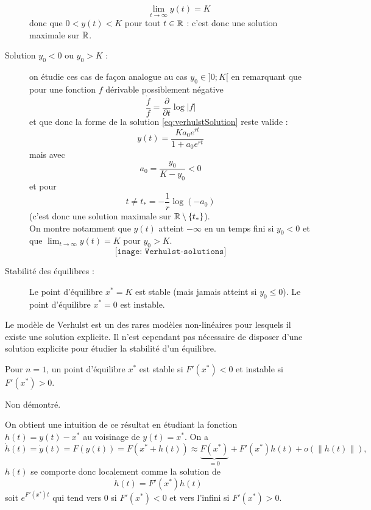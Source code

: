 \begin{description}
$$  \qquad
  \lim_{t \rightarrow \infty} y(t) = K
  $$
  donc que $0 < y(t) < K$ pour tout $t \in \mathbb{R}$ : c'est donc une solution maximale sur $\mathbb{R}$. \\
  \item[Solution $y_0 < 0$ ou $y_0 > K$ :] on étudie ces cas de façon analogue au cas $y_0 \in ]0; K[$ en remarquant que pour une fonction $f$ dérivable possiblement négative 
  $$
  \frac{\dot f}{f} = \frac{\partial}{\partial t} \log |f|
  $$
  et que donc la forme de la solution \eqref{eq:verhulstSolution} reste valide : 
  $$
  y(t) = \frac{K a_ 0 e^{rt}}{1 +  a_0 e^{rt}}
  $$
  mais avec
  $$
  a_0 = \frac{y_0}{K-y_0} < 0
  $$ 
  et pour 
  $$
  t \neq t_* = -\frac1r \log(-a_0)
  $$
  (c'est donc une solution maximale sur $\mathbb{R} \setminus \left\{t_*\right\}$). \\
  On montre notamment que $y(t)$ atteint $- \infty$ en un temps fini si $y_0 < 0$ et que $\lim_{t \rightarrow \infty} y(t) = K$ pour $y_0 > K$.
  $$
  \texttt{[image: Verhulst-solutions]}
  $$
  \item[Stabilité des équilibres :]
  Le point d'équilibre $x^* = K$ est stable (mais jamais atteint si $y_0 \leq 0$). Le point d'équilibre $x^* = 0$ est instable.
\end{description}

\remark
Le modèle de Verhulst est un des rares modèles non-linéaires pour lesquels il existe une solution explicite. Il n'est cependant pas nécessaire de disposer d'une solution explicite pour étudier la stabilité d'un équilibre.

\begin{theorem}[Stabilité ($n = 1$)]
  Pour $n=1$, un point d'équilibre $x^*$ est stable si $F'(x^*) < 0$ et instable si $F'(x^*) > 0$.
\end{theorem}

\proof Non démontré. \eproof

\remark
On obtient une intuition de ce résultat en étudiant la fonction $h(t) = y(t) - x^*$ au voisinage de $y(t) = x^*$. On a
$$
\dot h(t) = \dot y(t) = F(y(t)) = F(x^* + h(t)) \approx \underset{=0}{\underbrace{F(x^*)}} + F'(x^*) h(t) + o(\|h(t)\|),
$$
$h(t)$ se comporte donc localement comme la solution de 
$$
\dot h(t) = F'(x^*) h(t)
$$
soit $e ^{F'(x^*) t}$ qui tend vers 0 si $F'(x^*) < 0$ et vers l'infini si $F'(x^*) > 0$.


